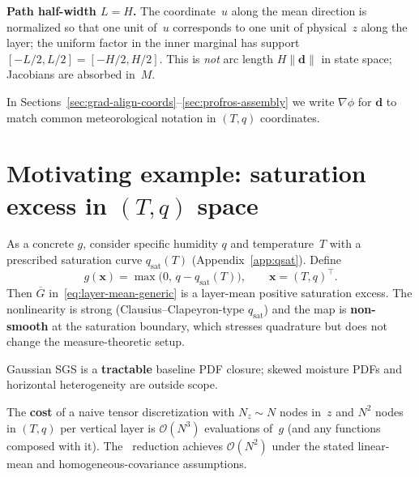 \documentclass[11pt,a4paper]{article}
\begin{document}
\textbf{Path half-width $L=H$.}
The coordinate~$u$ along the mean direction is normalized so that one unit of~$u$ corresponds to one unit of physical~$z$ along the layer; the uniform factor in the inner marginal has support $[-L/2,L/2]=[-H/2,H/2]$.
This is \emph{not} arc length $H\|\mathbf{d}\|$ in state space; Jacobians are absorbed in~$M$.

In Sections~\ref{sec:grad-align-coords}--\ref{sec:profros-assembly} we write $\nabla\phi$ for $\mathbf{d}$ to match common meteorological notation in $(T,q)$ coordinates.

\section{Motivating example: saturation excess in \texorpdfstring{$(T,q)$}{(T,q)} space}
\label{sec:motivating-example}

As a concrete $g$, consider specific humidity $q$ and temperature~$T$ with a prescribed saturation curve $q_{\mathrm{sat}}(T)$ (Appendix~\ref{app:qsat}).
Define
\[
  g(\mathbf{x})=\max\bigl(0,\,q-q_{\mathrm{sat}}(T)\bigr),\qquad \mathbf{x}=(T,q)^\top.
\]
Then $\overline{G}$ in~\eqref{eq:layer-mean-generic} is a layer-mean positive saturation excess.
The nonlinearity is strong (Clausius--Clapeyron-type $q_{\mathrm{sat}}$) and the map is \textbf{non-smooth} at the saturation boundary, which stresses quadrature but does not change the measure-theoretic setup.

Gaussian SGS is a \textbf{tractable} baseline PDF closure; skewed moisture PDFs and horizontal heterogeneity are outside scope.

The \textbf{cost} of a naive tensor discretization with $N_z\sim N$ nodes in~$z$ and $N^2$ nodes in $(T,q)$ per vertical layer is $\mathcal{O}(N^3)$ evaluations of~$g$ (and any functions composed with it).
The \profileros\ reduction achieves $\mathcal{O}(N^2)$ under the stated linear-mean and homogeneous-covariance assumptions.
\end{document}
